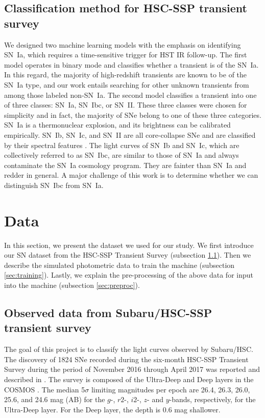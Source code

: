 \documentclass[useamsfonts]{pasj01}
\begin{document}
\subsection{Classification method for HSC-SSP transient survey}
We designed two machine learning models with the emphasis on identifying SN~Ia, which requires a time-sensitive trigger for HST IR follow-up. 
The first model operates in binary mode and classifies whether a transient is of the SN~Ia. 
In this regard, the majority of high-redshift transients are known to be of the SN~Ia type, and our work entails searching for other unknown transients from among those labeled non-SN~Ia. 
The second model classifies a transient into one of three classes: SN~Ia, SN~Ibc, or SN~II.  
These three classes were chosen for simplicity and in fact, the majority of SNe belong to one of these three categories. 
SN~Ia is a thermonuclear explosion, and its brightness can be calibrated empirically.
SN~Ib, SN~Ic, and SN~II are all core-collapse SNe and are classified by their spectral features \citep{filippenko97a}.
The light curves of SN~Ib and SN~Ic, which are collectively referred to as SN~Ibc, are similar to those of SN~Ia and always contaminate the SN~Ia cosmology program. They are fainter than SN~Ia and redder in general. 
A major challenge of this work is to determine whether we can distinguish SN~Ibc from SN~Ia.
%
%

\section{Data}
In this section, we present the dataset we used for our study.
We first introduce our SN dataset from the HSC-SSP Transient Survey (subsection \ref{sec:hscdata}).
Then we describe the simulated photometric data to train the machine (subsection \ref{sec:training}).
Lastly, we explain the pre-processing of the above data for input into the machine (subsection \ref{sec:preproc}).

\subsection{Observed data from Subaru/HSC-SSP transient survey}
\label{sec:hscdata}
The goal of this project is to classify the light curves observed by Subaru/HSC.  
The discovery of 1824 SNe recorded during the six-month HSC-SSP Transient Survey during the period of November 2016 through April 2017 was reported and described in \citet{yasuda19a}.
The survey is composed of the Ultra-Deep and Deep layers in the COSMOS \citep{scoville07a}.
The median 5$\sigma$ limiting magnitudes per epoch are 26.4, 26.3, 26.0, 25.6, and 24.6 mag (AB) for the $g$-, $r2$-, $i2$-, $z$- and $y$-bands, respectively, for the Ultra-Deep layer. 
For the Deep layer, the depth is 0.6 mag shallower.
\end{document}
